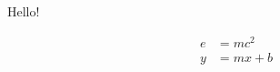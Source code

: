 \documentclass{article}
\begin{document}
Hello!

\begin{align}
e&=mc^2\\
y&=mx+b
\end{align}
\end{document}
